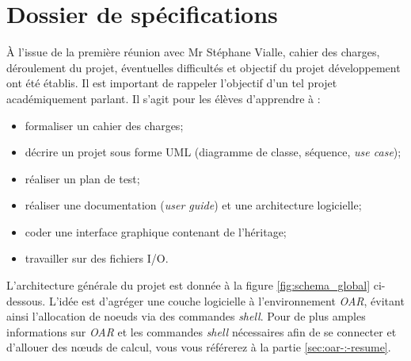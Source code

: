 \section{Dossier de spécifications}

\par À l’issue de la première réunion avec Mr Stéphane Vialle, cahier des charges, déroulement du projet, éventuelles difficultés et objectif du projet développement ont été établis. Il est important de rappeler l'objectif d'un tel projet académiquement parlant. Il s'agit pour les élèves d'apprendre à :

\begin{itemize}
\item formaliser un cahier des charges;
\item décrire un projet sous forme UML (diagramme de classe, séquence, \emph{use case});
\item réaliser un plan de test;
\item réaliser une documentation (\emph{user guide}) et une architecture logicielle;
\item coder une interface graphique contenant de l’héritage;
\item travailler sur des fichiers I/O.
\end{itemize}

\par L’architecture générale du projet est donnée à la figure \vref{fig:schema_global} ci-dessous. L’idée est d’agréger une couche logicielle à l’environnement \emph{OAR}, évitant ainsi l'allocation de noeuds via des commandes \emph{shell}.  Pour de plus amples informations sur \emph{OAR} et les commandes \emph{shell} nécessaires afin de se connecter et d’allouer des nœuds de calcul, vous vous référerez à la partie \vref{sec:oar-:-resume}.

